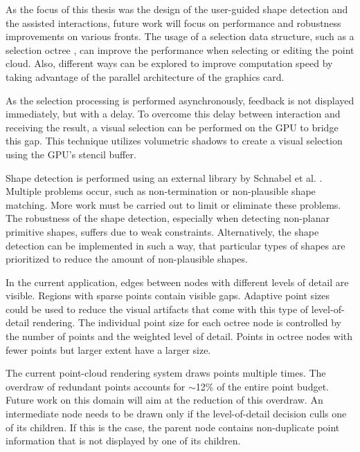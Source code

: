 As the focus of this thesis was the design of the user-guided shape detection and the assisted interactions, future work will focus on performance and robustness improvements on various fronts. The usage of a selection data structure, such as a selection octree \cite{scheiblauer2011out}, can improve the performance when selecting or editing the point cloud. Also, different ways can be explored to improve computation speed by taking advantage of the parallel architecture of the graphics card. 

\par

As the selection processing is performed asynchronously, feedback is not displayed immediately, but with a delay. To overcome this delay between interaction and receiving the result, a visual selection can be performed on the GPU \cite{rainer2016visual} to bridge this gap. This technique utilizes volumetric shadows to create a visual selection using the GPU's stencil buffer. 

\par

Shape detection is performed using an external library by Schnabel et al. \cite{schnabel-2007-software}. Multiple problems occur, such as non-termination or non-plausible shape matching. More work must be carried out to limit or eliminate these problems. The robustness of the shape detection, especially when detecting non-planar primitive shapes, suffers due to weak constraints. Alternatively, the shape detection can be implemented in such a way, that particular types of shapes are prioritized to reduce the amount of non-plausible shapes. 

\par

In the current application, edges between nodes with different levels of detail are visible. Regions with sparse points contain visible gaps. Adaptive point sizes \cite{scheiblauer-thesis} could be used to reduce the visual artifacts that come with this type of level-of-detail rendering. The individual point size for each octree node is controlled by the number of points and the weighted level of detail. Points in octree nodes with fewer points but larger extent have a larger size. 

\par 

The current point-cloud rendering system draws points multiple times. The overdraw of redundant points accounts for $\sim$12\% of the entire point budget. Future work on this domain will aim at the reduction of this overdraw. An intermediate node needs to be drawn only if the level-of-detail decision culls one of its children. If this is the case, the parent node contains non-duplicate point information that is not displayed by one of its children.